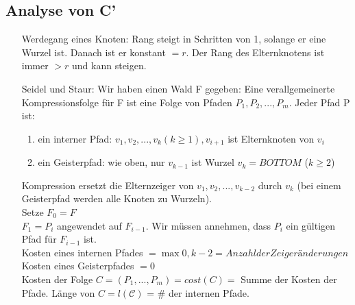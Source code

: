 \subsection{Analyse von C'}
\begin{enumerate}
\item[Werdegang eines Knoten:] Rang steigt in Schritten von 1, solange er eine Wurzel ist. Danach ist er konstant $=r$. Der Rang des Elternknotens ist immer $>r$ und kann steigen.
\item[Seidel und Staur:] Wir haben einen Wald F gegeben: Eine verallgemeinerte Kompressionsfolge für F ist eine Folge von Pfaden $P_1,P_2,...,P_m$. Jeder Pfad P ist:
\begin{enumerate}
\item ein interner Pfad: $v_1,v_2,...,v_k (k\geq 1), v_{i+1}$ ist Elternknoten von $v_i$
\item ein Geisterpfad: wie oben, nur $v_{k-1}$ ist Wurzel $v_k = BOTTOM$ ($k\geq 2$)
\end{enumerate}
Kompression ersetzt die Elternzeiger von $v_1,v_2,...,v_{k-2}$ durch $v_k$ (bei einem Geisterpfad werden alle Knoten zu Wurzeln).\\
Setze $F_0 = F$\\
$F_1 = P_i$ angewendet auf $F_{i-1}$. Wir müssen annehmen, dass $P_i$ ein gültigen Pfad für $F_{i-1}$ ist.\\
Kosten eines internen Pfades $= \max{0,k-2} = Anzahl der Zeigeränderungen$\\
Kosten eines Geisterpfades $=0$\\
Kosten der Folge $C=(P_1,...,P_m)=cost(C)=$ Summe der Kosten der Pfade. Länge von $C = l(\mathcal{C})$ = $\#$ der internen Pfade.  
\end{enumerate}
